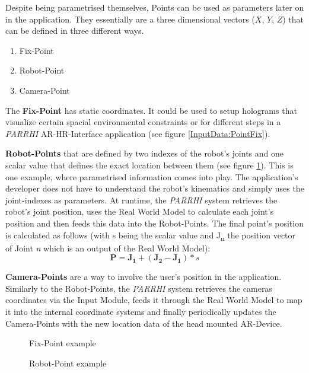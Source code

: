 Despite being parametrised themselves, Points can be used as parameters later on in the application. They essentially are a three dimensional vectors ($X$, $Y$, $Z$) that can be defined in three different ways. 
\begin{enumerate}
	\setlength\itemsep{-1em}
	\item Fix-Point
	\item Robot-Point
	\item Camera-Point
\end{enumerate}

The \textbf{Fix-Point} has static coordinates. It could be used to setup holograms that visualize certain spacial environmental constraints or for different steps in a \textit{PARRHI} AR-HR-Interface application (see figure \ref{InputData:PointFix}).

\textbf{Robot-Points} that are defined by two indexes of the robot's joints and one scalar value that defines the exact location between them (see figure \ref{InputData:PointRobot}). This is one example, where parametrised information comes into play. The application's developer does not have to understand the robot's kinematics and simply uses the joint-indexes as parameters. At runtime, the \textit{PARRHI} system retrieves the robot's joint position, uses the Real World Model to calculate each joint's position and then feeds this data into the Robot-Points. The final point's position is calculated as follows (with s being the scalar value and J\textsubscript{n} the position vector of Joint \textit{n} which is an output of the Real World Model):
\begin{equation}
\boldsymbol{P} = \boldsymbol{J_1} + (\boldsymbol{J_2}-\boldsymbol{J_1}) * s
\end{equation}

\textbf{Camera-Points} are a way to involve the user's position in the application. Similarly to the Robot-Points, the \textit{PARRHI} system retrieves the cameras coordinates via the Input Module, feeds it through the Real World Model to map it into the internal coordinate systems and finally periodically updates the Camera-Points with the new location data of the head mounted AR-Device.


\begin{figure}
	\begin{minipage}{0.45\textwidth}
		\centering
		
		\caption{Fix-Point example}
		\label{InputData:PointFix}
	\end{minipage}\hfill
	\begin{minipage}{0.45\textwidth}
		\centering
		
		\caption{Robot-Point example}
		\label{InputData:PointRobot}
	\end{minipage}
\end{figure}


